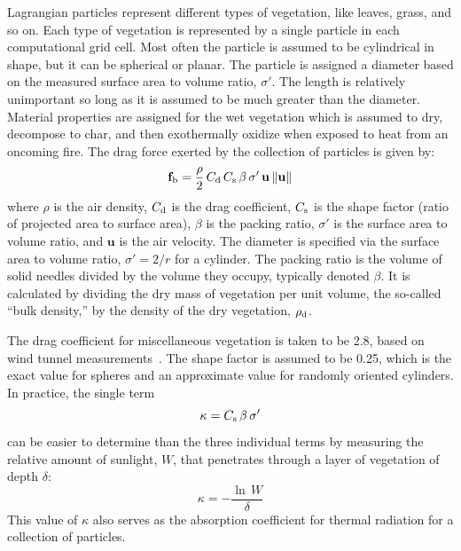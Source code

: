 \documentclass[journal,article,atmosphere,submit,moreauthors,pdftex]{Definitions/mdpi}
\begin{document}
Lagrangian particles represent different types of vegetation, like leaves, grass, and so on. Each type of vegetation is represented by a single particle in each computational grid cell. Most often the particle is assumed to be cylindrical in shape, but it can be spherical or planar. The particle is assigned a diameter based on the measured surface area to volume ratio, $\sigma'$. The length is relatively unimportant so long as it is assumed to be much greater than the diameter. Material properties are assigned for the wet vegetation which is assumed to dry, decompose to char, and then exothermally oxidize when exposed to heat from an oncoming fire. The drag force exerted by the collection of particles is given by:
\begin{equation}
   \mathbf{f}_{\rm b} = \frac{\rho}{2} \, C_{\rm d} \, C_{\rm s} \, \beta \, \sigma' \, \mathbf{u} \, \|\mathbf{u}\|
   \label{drag}
\end{equation}
where $\rho$ is the air density, $C_{\rm d}$ is the drag coefficient, $C_{\rm s}$ is the shape factor (ratio of projected area to surface area), $\beta$ is the packing ratio, $\sigma'$ is the surface area to volume ratio, and $\mathbf{u}$ is the air velocity. The diameter is specified via the surface area to volume ratio, $\sigma'=2/r$ for a cylinder. The packing ratio is the volume of solid needles divided by the volume they occupy, typically denoted $\beta$. It is calculated by dividing the dry mass of vegetation per unit volume, the so-called ``bulk density,'' by the density of the dry vegetation, $\rho_{\rm d}$.

The drag coefficient for miscellaneous vegetation is taken to be 2.8, based on wind tunnel measurements~\cite{Falkenstein-Smith:2018}. The shape factor is assumed to be 0.25, which is the exact value for spheres and an approximate value for randomly oriented cylinders. In practice, the single term
\begin{equation}
   \kappa = C_{\rm s}  \, \beta \, \sigma'
\end{equation}
can be easier to determine than the three individual terms by measuring the relative amount of sunlight, $W$, that penetrates through a layer of vegetation of depth $\delta$:
\begin{equation}
   \kappa = -\frac{\ln \, W}{\delta}
\end{equation}
This value of $\kappa$ also serves as the absorption coefficient for thermal radiation for a collection of particles.
\end{document}
